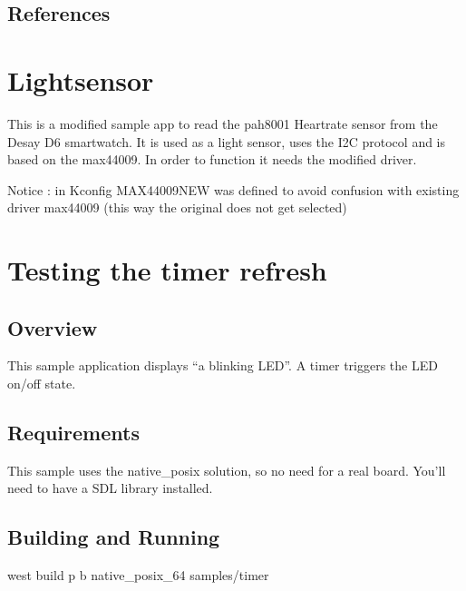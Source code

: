\documentclass[letterpaper,10pt,english]{sphinxmanual}
\begin{document}
\subsection{References}
\label{\detokenize{samples/sampleslvglREADME:references}}

\section{Lightsensor}
\label{\detokenize{samples/samplesmax44009README:lightsensor}}\label{\detokenize{samples/samplesmax44009README::doc}}
This is a modified sample app to read the pah8001 Heartrate sensor from the Desay D6 smartwatch.
It is used as a light sensor, uses the I2C protocol and is based on the max44009.
In order to function it needs the modified driver.

Notice :  in Kconfig MAX44009NEW was defined to avoid confusion with existing driver max44009
(this way the original does not get selected)


\section{Testing the timer refresh}
\label{\detokenize{samples/samplestimerREADME:testing-the-timer-refresh}}\label{\detokenize{samples/samplestimerREADME:sdl-sample}}\label{\detokenize{samples/samplestimerREADME::doc}}

\subsection{Overview}
\label{\detokenize{samples/samplestimerREADME:overview}}
This sample application displays “a blinking LED”.
A timer triggers the LED on/off state.


\subsection{Requirements}
\label{\detokenize{samples/samplestimerREADME:requirements}}
This sample uses the native\_posix solution, so no need for a real board.
You’ll need to have a SDL library installed.


\subsection{Building and Running}
\label{\detokenize{samples/samplestimerREADME:building-and-running}}
west build \sphinxhyphen{}p \sphinxhyphen{}b native\_posix\_64 samples/timer
\end{document}
